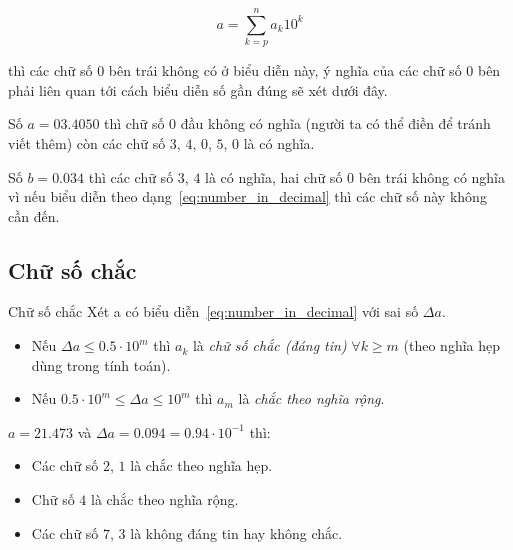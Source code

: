 \documentclass[../../Lectures.tex]{subfiles}
\begin{document}
\begin{equation} \label{eq:number_in_decimal}
    a = \sum_{k=p}^{n} a_k10^k
\end{equation}

thì các chữ số \(0\) bên trái không có ở biểu diễn này, ý nghĩa của các chữ số
\(0\) bên phải liên quan tới cách biểu diễn số gần đúng sẽ xét dưới đây.

\begin{exmp}
    Số \(a = 03.4050\) thì chữ số \(0\) đầu không có nghĩa (người ta có thể điền
    để tránh viết thêm) còn các chữ số \(3\), \(4\), \(0\), \(5\), \(0\) là có
    nghĩa.

    Số \(b = 0.034\) thì các chữ số \(3\), \(4\) là có nghĩa, hai chữ số \(0\)
    bên trái không có nghĩa vì nếu biểu diễn theo dạng~\ref{eq:number_in_decimal}
    thì các chữ số này không cần đến.
\end{exmp}

\subsection{Chữ số chắc}

\begin{cdefinition}{Chữ số chắc}{}
    Xét a có biểu diễn~\ref{eq:number_in_decimal} với sai số \(\Delta a\).

    \begin{itemize}
        \item Nếu \(\Delta a \leq \num{0.5} \cdot 10^m\) thì \(a_k\) là
            \emph{chữ số chắc (đáng tin)} \(\forall k \geq m\) (theo nghĩa hẹp
            dùng trong tính toán).

        \item Nếu \(\num{0.5} \cdot 10^m \leq \Delta a \leq 10^m\) thì \(a_m\)
            là \emph{chắc theo nghĩa rộng}.
    \end{itemize}
\end{cdefinition}

\begin{exmp}
    \(a = \num{21.473}\) và \(\Delta a = \num{0.094} = \num{0.94} \cdot
    10^{-1}\) thì:

    \begin{itemize}
        \item Các chữ số \(2\), \(1\) là chắc theo nghĩa hẹp.
        \item Chữ số \(4\) là chắc theo nghĩa rộng.
        \item Các chữ số \(7\), \(3\) là không đáng tin hay không chắc.
    \end{itemize}
\end{exmp}
\end{document}
